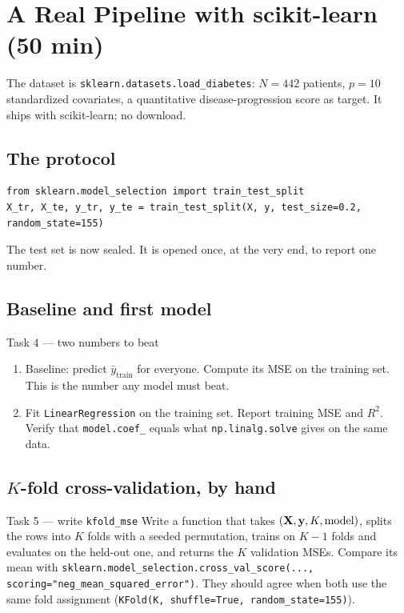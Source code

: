 \documentclass[11pt]{article}
\begin{document}
\section{A Real Pipeline with scikit-learn (50 min)}

The dataset is \texttt{sklearn.datasets.load\_diabetes}: $N=442$ patients, $p=10$ standardized
covariates, a quantitative disease-progression score as target. It ships with scikit-learn; no download.

\subsection{The protocol}
\begin{lstlisting}
from sklearn.model_selection import train_test_split
X_tr, X_te, y_tr, y_te = train_test_split(X, y, test_size=0.2, random_state=155)
\end{lstlisting}
The test set is now sealed. It is opened once, at the very end, to report one number.

\subsection{Baseline and first model}
\begin{task}{Task 4 --- two numbers to beat}
\begin{enumerate}[nosep]
  \item Baseline: predict $\bar y_{\text{train}}$ for everyone. Compute its MSE on the training set.
        This is the number any model must beat.
  \item Fit \texttt{LinearRegression} on the training set. Report training MSE and $R^2$.
        Verify that \texttt{model.coef\_} equals what \texttt{np.linalg.solve} gives on the same data.
\end{enumerate}
\end{task}

\subsection{$K$-fold cross-validation, by hand}
\begin{task}{Task 5 --- write \texttt{kfold\_mse}}
Write a function that takes $(\mathbf{X},\mathbf{y},K,\text{model})$, splits the rows into $K$ folds with a seeded
permutation, trains on $K-1$ folds and evaluates on the held-out one, and returns the $K$ validation MSEs.
Compare its mean with \texttt{sklearn.model\_selection.cross\_val\_score(..., scoring="neg\_mean\_squared\_error")}.
They should agree when both use the same fold assignment (\texttt{KFold(K, shuffle=True, random\_state=155)}).
\end{task}
\end{document}
